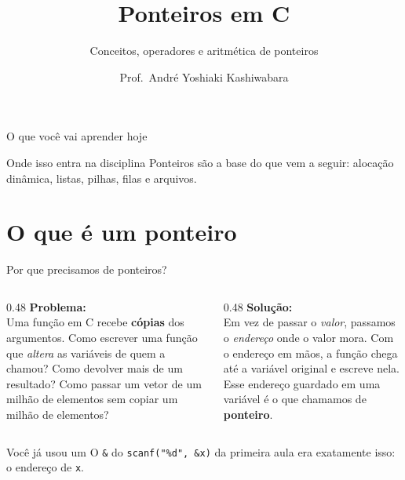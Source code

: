 \documentclass[aspectratio=169]{beamer}
\title{Ponteiros em C}
\subtitle{Conceitos, operadores e aritmética de ponteiros}
\author{Prof.\ André Yoshiaki Kashiwabara}
\institute{DCOMP -- Universidade Federal de Sergipe\\
\texttt{andreyoshiaki@dcomp.ufs.br}}
\date{}
\begin{document}
\begin{frame}[plain]
  \titlepage
\end{frame}

\begin{frame}{O que você vai aprender hoje}
  \begin{center}
  \end{center}
  \begin{block}{Onde isso entra na disciplina}
    Ponteiros são a base do que vem a seguir: alocação dinâmica, listas,
    pilhas, filas e arquivos.
  \end{block}
\end{frame}

\section{O que é um ponteiro}

\begin{frame}{Por que precisamos de ponteiros?}
  \begin{columns}[T]
    \begin{column}{0.48\textwidth}
      \textbf{Problema:}\\[2mm]
      Uma função em C recebe \textbf{cópias} dos argumentos. Como escrever
      uma função que \emph{altera} as variáveis de quem a chamou? Como
      devolver mais de um resultado? Como passar um vetor de um milhão de
      elementos sem copiar um milhão de elementos?
    \end{column}
    \begin{column}{0.48\textwidth}
      \textbf{Solução:}\\[2mm]
      Em vez de passar o \emph{valor}, passamos o \emph{endereço} onde o
      valor mora. Com o endereço em mãos, a função chega até a variável
      original e escreve nela. Esse endereço guardado em uma variável é o
      que chamamos de \textbf{ponteiro}.
    \end{column}
  \end{columns}
  \begin{exampleblock}{Você já usou um}
    O \texttt{\&} do \texttt{scanf("\%d", \&x)} da primeira aula era
    exatamente isso: o endereço de \texttt{x}.
  \end{exampleblock}
\end{frame}
\end{document}
